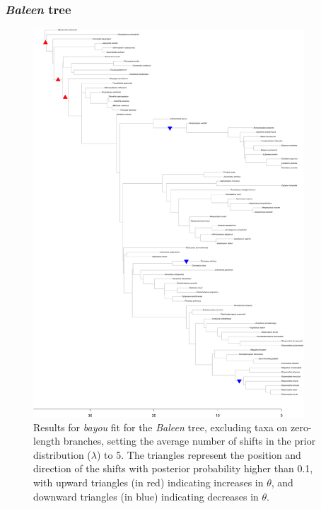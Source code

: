 \subsubsection{\textit{Baleen} tree}
\begin{figure}[H]
\includegraphics[width=0.9\textwidth]{img/plots-baleen-k5-1.pdf}
\caption{Results for \textit{bayou} fit for the \textit{Baleen} tree, excluding taxa on zero-length branches, setting the average number of shifts in the prior distribution ($\lambda$) to 5. The triangles represent the position and direction of the shifts with posterior probability higher than 0.1, with upward triangles (in red) indicating increases in $\theta$, and downward triangles (in blue) indicating decreases in $\theta$.}
\label{fig:baleen-k5-nzlb}
\end{figure}

\newpage

